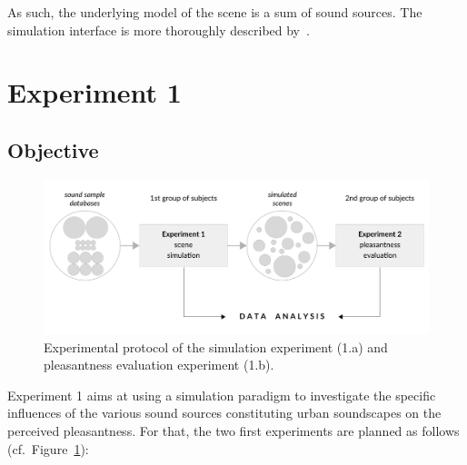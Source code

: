 \documentclass[12pt]{elsarticle}
\newcommand{\cf}{cf.}
\begin{document}
As such, the underlying model of the scene is a sum of sound sources. The simulation interface is more thoroughly described by~\cite{rossignol2015simscene}.




\section{Experiment 1}
\label{sec:simulation}

\subsection{Objective}

\begin{figure}[t]
        \includegraphics[width=\linewidth]{gfx/5.pdf}
        \caption{Experimental protocol of the simulation experiment (1.a) and pleasantness evaluation experiment (1.b).}\label{fig:xp1_2}
\end{figure}


Experiment 1 aims at using a simulation paradigm to investigate the specific influences of the various sound sources constituting urban soundscapes on the perceived pleasantness. For that, the two first experiments are planned as follows (\cf~Figure~\ref{fig:xp1_2}):
\end{document}
